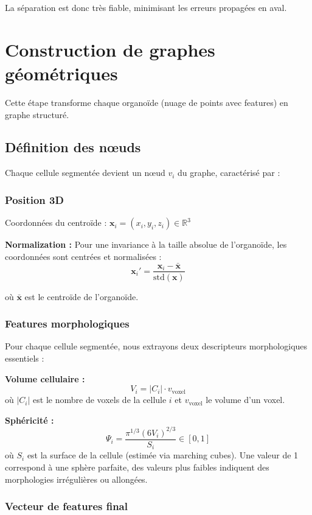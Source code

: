 La séparation est donc très fiable, minimisant les erreurs propagées en aval.

\section{Construction de graphes géométriques}

Cette étape transforme chaque organoïde (nuage de points avec features) en graphe structuré.

\subsection{Définition des nœuds}

Chaque cellule segmentée devient un nœud $v_i$ du graphe, caractérisé par :

\subsubsection{Position 3D}

Coordonnées du centroïde : $\mathbf{x}_i = (x_i, y_i, z_i) \in \mathbb{R}^3$

\textbf{Normalization :}
Pour une invariance à la taille absolue de l'organoïde, les coordonnées sont centrées et normalisées :
\[
\mathbf{x}_i' = \frac{\mathbf{x}_i - \bar{\mathbf{x}}}{\text{std}(\mathbf{x})}
\]

où $\bar{\mathbf{x}}$ est le centroïde de l'organoïde.

\subsubsection{Features morphologiques}

Pour chaque cellule segmentée, nous extrayons deux descripteurs morphologiques essentiels :

\textbf{Volume cellulaire :}
\[
V_i = |C_i| \cdot v_{\text{voxel}}
\]
où $|C_i|$ est le nombre de voxels de la cellule $i$ et $v_{\text{voxel}}$ le volume d'un voxel.

\textbf{Sphéricité :}
\[
\Psi_i = \frac{\pi^{1/3}(6V_i)^{2/3}}{S_i} \in [0,1]
\]
où $S_i$ est la surface de la cellule (estimée via marching cubes). Une valeur de 1 correspond à une sphère parfaite, des valeurs plus faibles indiquent des morphologies irrégulières ou allongées.

\subsubsection{Vecteur de features final}

